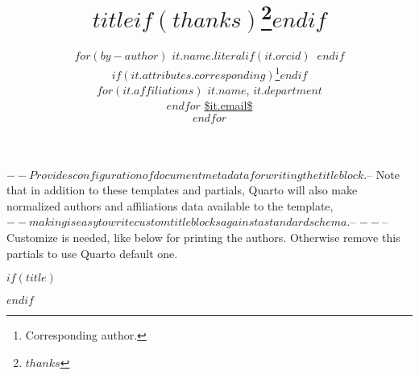 $-- Provides configuration of document metadata for writing the title block.
$-- Note that in addition to these templates and partials, Quarto will also make normalized authors and affiliations data available to the template,
$-- making is easy to write custom title blocks against a standard schema.
$--
$-- %
$-- Customize is needed, like below for printing the authors. Otherwise remove this partials to use Quarto default one.


$if(title)$
\title{$title$$if(thanks)$\thanks{$thanks$}$endif$}
$endif$

\author{
$for(by-author)$
{\bfseries $it.name.literal$$if(it.orcid)$~$endif$}%
$if(it.attributes.corresponding)$\thanks{Corresponding author.}$endif$ \\%
$for(it.affiliations)$ \small $it.name$, $it.department$ \\$endfor$%
{\footnotesize \url{$it.email$}} \\\vspace{10pt}
$endfor$
}

\predate{}
\postdate{}
\date{}
